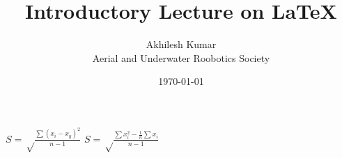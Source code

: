 \documentclass{article}
\title{Introductory Lecture on \LaTeX}
\author{Akhilesh Kumar\\Aerial and Underwater Roobotics Society }
\date{\today}
\begin{document}

$S = \sqrt \frac{\sum { } { } (x_{i} - x_{y} )^{2}} {n-1}$ \hspace*{1in}
$S = \sqrt \frac{\sum { } { } x_{i}^{2} - \frac{1}{n} \sum x_{i} }{n-1}$ 

\end{document}
